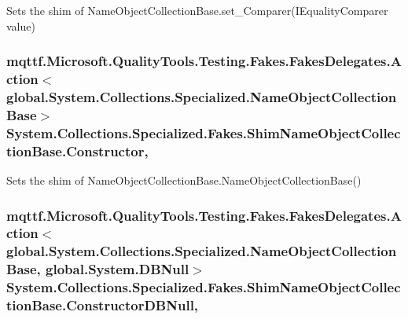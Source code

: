 Sets the shim of Name\-Object\-Collection\-Base.\-set\-\_\-\-Comparer(\-I\-Equality\-Comparer value)

\hypertarget{class_system_1_1_collections_1_1_specialized_1_1_fakes_1_1_shim_name_object_collection_base_a5d9ca8bb40d564277df86c31f2436e3f}{
\subsubsection[{Constructor}]{\setlength{\rightskip}{0pt plus 5cm}mqttf.\-Microsoft.\-Quality\-Tools.\-Testing.\-Fakes.\-Fakes\-Delegates.\-Action$<$global.\-System.\-Collections.\-Specialized.\-Name\-Object\-Collection\-Base$>$ System.\-Collections.\-Specialized.\-Fakes.\-Shim\-Name\-Object\-Collection\-Base.\-Constructor\hspace{0.3cm}{\ttfamily [static]}, {\ttfamily [set]}}}\label{class_system_1_1_collections_1_1_specialized_1_1_fakes_1_1_shim_name_object_collection_base_a5d9ca8bb40d564277df86c31f2436e3f}


Sets the shim of Name\-Object\-Collection\-Base.\-Name\-Object\-Collection\-Base()

\hypertarget{class_system_1_1_collections_1_1_specialized_1_1_fakes_1_1_shim_name_object_collection_base_a4f7a813f59ef983732490861771be42f}{
\subsubsection[{Constructor\-D\-B\-Null}]{\setlength{\rightskip}{0pt plus 5cm}mqttf.\-Microsoft.\-Quality\-Tools.\-Testing.\-Fakes.\-Fakes\-Delegates.\-Action$<$global.\-System.\-Collections.\-Specialized.\-Name\-Object\-Collection\-Base, global.\-System.\-D\-B\-Null$>$ System.\-Collections.\-Specialized.\-Fakes.\-Shim\-Name\-Object\-Collection\-Base.\-Constructor\-D\-B\-Null\hspace{0.3cm}{\ttfamily [static]}, {\ttfamily [set]}}}\label{class_system_1_1_collections_1_1_specialized_1_1_fakes_1_1_shim_name_object_collection_base_a4f7a813f59ef983732490861771be42f}


